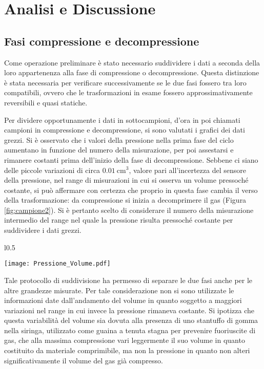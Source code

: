 \documentclass[a4paper,11pt,oneside]{article}
\begin{document}
\section{Analisi e Discussione}
\subsection{Fasi compressione e decompressione}\label{par:compress}
Come operazione preliminare è stato necessario suddividere i dati a seconda della loro appartenenza alla fase di compressione o decompressione. Questa distinzione è stata necessaria per verificare successivamente se le due fasi fossero tra loro compatibili, ovvero che le trasformazioni in esame fossero approssimativamente reversibili e quasi statiche.

Per dividere opportunamente i dati in sottocampioni, d'ora in poi chiamati campioni in compressione e decompressione, si sono valutati i grafici dei dati grezzi. Si è osservato che i valori della pressione nella prima fase del ciclo aumentano in funzione del numero della misurazione, per poi assestarsi e rimanere costanti prima dell'inizio della fase di decompressione. Sebbene ci siano delle piccole variazioni di circa $\SI{0.01}{\centi\meter\cubed}$, valore pari all'incertezza del sensore della pressione,  nel range di misurazioni in cui si osserva un volume pressoché costante, si può affermare con certezza che proprio in questa fase cambia il verso della trasformazione: da compressione si inizia a decomprimere il gas (Figura \ref{fig:campione2}). Si è pertanto scelto di considerare il numero della misurazione intermedio del range nel quale la pressione risulta pressoché costante per suddividere i dati grezzi.
\begin{wrapfigure}{l}{0.5\textwidth}
  \begin{center}
    \texttt{[image: Pressione\_Volume.pdf]}
  \end{center}
  \caption{Pressioni e Volumi Primo Campione}
  \label{fig:campione2}
\end{wrapfigure}

Tale protocollo di suddivisione ha permesso di separare le due fasi anche per le altre grandezze misurate. Per tale considerazione non si sono utilizzate le informazioni date dall'andamento del volume in quanto soggetto a maggiori variazioni nel range in cui invece la pressione rimaneva costante. Si ipotizza che questa variabilità del volume sia dovuta alla presenza di uno stantuffo di gomma nella siringa, utilizzato come guaina a tenuta stagna per prevenire fuoriuscite di gas, che alla massima compressione vari leggermente il suo volume in quanto costituito da materiale comprimibile, ma non la pressione in quanto non alteri significativamente il volume del gas già compresso.
\end{document}
